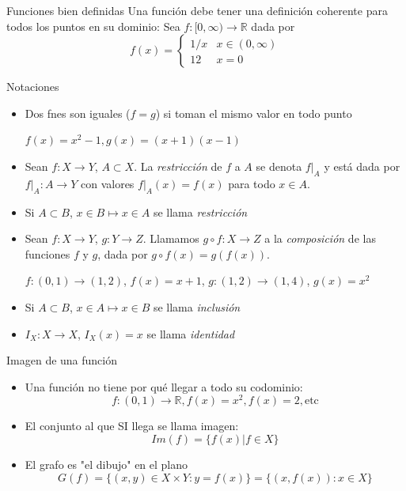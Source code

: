 \documentclass[14pt,aspectratio=169,xcolor=dvipsnames]{beamer}
\begin{document}
\begin{frame}{Funciones bien definidas}
    Una función debe tener una definición coherente para todos los puntos en su dominio: Sea $f:[0,\infty) \to \mathbb R$ dada por
    $$ f(x) = 
    \begin{cases}
        1/x & x\in (0,\infty) \\
        12  & x = 0
    \end{cases}
    $$
\end{frame}
\begin{frame}{Notaciones}
    \begin{small}
    \begin{itemize}
            \item Dos fnes son iguales ($f=g$) si toman el mismo valor en todo punto 
                \begin{flushright}
                    $f(x) = x^2-1, g(x) = (x+1)(x-1)$
                \end{flushright}
            \item Sean $f:X\to Y$, $A\subset X$. La \emph{restricción} de $f$ a $A$ se denota $f|_A$ y está dada por $f|_A:A\to Y$ con valores $f|_A(x)=f(x)$ para todo $x \in A$. 
            \item Si $A\subset B$, $x\in B\mapsto x\in A$ se llama \emph{restricción}
            \item Sean $f:X\to Y$, $g:Y\to Z$. Llamamos $g\circ f:X\to Z$ a la \emph{composición} de las funciones $f$ y $g$, dada por $g\circ f(x) = g(f(x))$. 
                \begin{flushright}
                    $f:(0,1)\to (1,2)$, $f(x) = x+1$, $g:(1,2)\to (1,4)$, $g(x) = x^2$
                \end{flushright}
            \item Si $A\subset B$, $x\in A\mapsto x\in B$ se llama \emph{inclusión}
            \item $I_X:X \to X$, $I_X(x) = x$ se llama \emph{identidad}
        \end{itemize}
    \end{small}
\end{frame}
\begin{frame}{Imagen de una función}
    \begin{itemize}
        \item Una función no tiene por qué llegar a todo su codominio:
            $$f:(0,1)\to \mathbb R, f(x) = x^2, f(x) = 2, \text{etc}$$
        \item El conjunto al que SI llega se llama imagen:
            $$ Im(f) = \{ f(x) | f \in X \} $$
        \item El grafo es "el dibujo" en el plano
            $$ G(f) = \{(x,y) \in X\times Y: y = f(x)\} = \{(x, f(x)): x\in X \}$$
    \end{itemize}
\end{frame}
\end{document}
